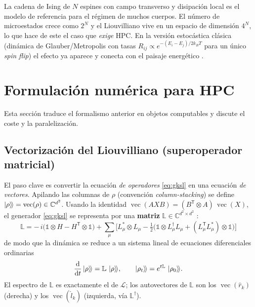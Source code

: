 \documentclass[11pt,a4paper]{article}
\theoremstyle{definition}
\theoremstyle{plain}
\newcommand{\Lop}{\mathcal{L}}
\newcommand{\vecop}[1]{\operatorname{vec}\!\left(#1\right)}
\begin{document}
La cadena de Ising de $N$ espines con campo transverso y disipación local es el modelo de referencia para el
régimen de muchos cuerpos. El número de microestados crece como $2^N$ y el Liouvilliano vive en un espacio
de dimensión $4^N$, lo que hace de este el caso que \emph{exige} HPC. En la versión estocástica clásica
(dinámica de Glauber/Metropolis con tasas $R_{ij}\propto e^{-(E_i-E_j)/2k_BT}$ para un único \emph{spin
flip}) el efecto ya aparece y conecta con el paisaje energético \cite{LuRaz2017,KlichRaz2019}.

\section{Formulación numérica para HPC}

Esta sección traduce el formalismo anterior en objetos computables y discute el coste y la paralelización.

\subsection{Vectorización del Liouvilliano (superoperador matricial)}

El paso clave es convertir la ecuación \emph{de operadores} \eqref{eq:gksl} en una ecuación \emph{de
vectores}. Apilando las columnas de $\rho$ (convención \emph{column-stacking}) se define
$\ket{\rho}\!\rangle=\vecop{\rho}\in\mathbb{C}^{d^2}$. Usando la identidad
$\vecop{A X B}=(B^{\mathsf{T}}\otimes A)\,\vecop{X}$, el generador \eqref{eq:gksl} se representa por una
\textbf{matriz} $\mathbb{L}\in\mathbb{C}^{d^2\times d^2}$ \cite{Minganti2018,Weimer2021}:
\begin{equation}
\boxed{\;
\mathbb{L}= -\,i\big(\mathbb{1}\otimes H - H^{\mathsf{T}}\otimes\mathbb{1}\big)
+\sum_{\mu}\Big[
L_\mu^{*}\otimes L_\mu
-\tfrac12\big(\mathbb{1}\otimes L_\mu^{\dagger}L_\mu
+ (L_\mu^{\mathsf{T}}L_\mu^{*})\otimes\mathbb{1}\big)\Big]\;}
\label{eq:vecL}
\end{equation}
de modo que la dinámica se reduce a un sistema lineal de ecuaciones diferenciales ordinarias
\begin{equation}
\dv{t}\ket{\rho}\!\rangle=\mathbb{L}\,\ket{\rho}\!\rangle,
\qquad
\ket{\rho_t}\!\rangle=e^{t\mathbb{L}}\,\ket{\rho_0}\!\rangle .
\end{equation}
El espectro de $\mathbb{L}$ es exactamente el de $\Lop$; los autovectores de $\mathbb{L}$ son los
$\vecop{\hat r_k}$ (derecha) y los $\vecop{\hat l_k}$ (izquierda, vía $\mathbb{L}^{\dagger}$).
\end{document}
